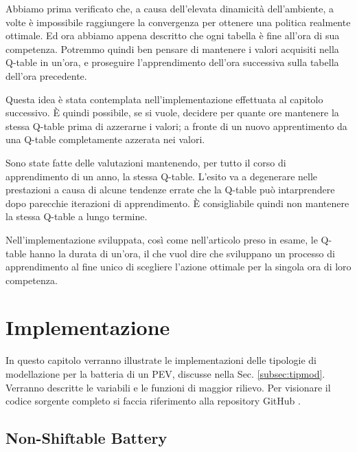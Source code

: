 \documentclass[italian, Lau, oneside]{sapthesis}
\begin{document}
Abbiamo prima verificato che, a causa dell'elevata dinamicità dell'ambiente, a volte è impossibile raggiungere la convergenza per ottenere una politica realmente ottimale. Ed ora abbiamo appena descritto che ogni tabella è fine all'ora di sua competenza. Potremmo quindi ben pensare di mantenere i valori acquisiti nella Q-table in un'ora, e proseguire l'apprendimento dell'ora successiva sulla tabella dell'ora precedente.

Questa idea è stata contemplata nell'implementazione effettuata al capitolo successivo. È quindi possibile, se si vuole, decidere per quante ore mantenere la stessa Q-table prima di azzerarne i valori; a fronte di un nuovo apprentimento da una Q-table completamente azzerata nei valori. 

Sono state fatte delle valutazioni mantenendo, per tutto il corso di apprendimento di un anno, la stessa Q-table. L'esito va a degenerare nelle prestazioni a causa di alcune tendenze errate che la Q-table può intarprendere dopo parecchie iterazioni di apprendimento. È consigliabile quindi non mantenere la stessa Q-table a lungo termine. 

Nell'implementazione sviluppata, così come nell'articolo preso in esame, le Q-table hanno la durata di un'ora, il che vuol dire che sviluppano un processo di apprendimento al fine unico di scegliere l'azione ottimale per la singola ora di loro competenza.





\chapter{Implementazione}
\label{cap:5}
In questo capitolo verranno illustrate le implementazioni delle tipologie di modellazione per la batteria di un PEV, discusse nella Sec. \ref{subsec:tipmod}. Verranno descritte le variabili e le funzioni di maggior rilievo. Per visionare il codice sorgente completo si faccia riferimento alla repository GitHub \cite{ref:github}.


\section{Non-Shiftable Battery}
\end{document}
